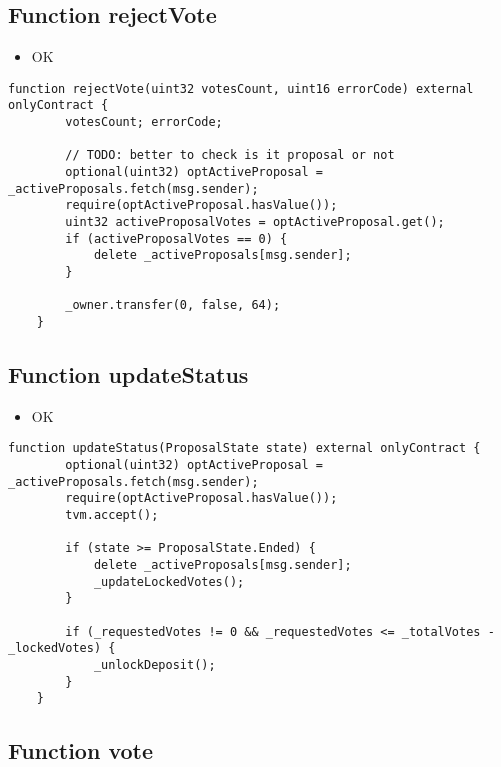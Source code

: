\subsection{Function rejectVote}

\begin{itemize}
\item OK
\end{itemize}

\begin{lstlisting}[firstnumber=87]
    function rejectVote(uint32 votesCount, uint16 errorCode) external onlyContract {
        votesCount; errorCode;

        // TODO: better to check is it proposal or not
        optional(uint32) optActiveProposal = _activeProposals.fetch(msg.sender);
        require(optActiveProposal.hasValue());
        uint32 activeProposalVotes = optActiveProposal.get();
        if (activeProposalVotes == 0) {
            delete _activeProposals[msg.sender];
        }

        _owner.transfer(0, false, 64);
    }
\end{lstlisting}

\subsection{Function updateStatus}

\begin{itemize}
\item OK
\end{itemize}

\begin{lstlisting}[firstnumber=127]
    function updateStatus(ProposalState state) external onlyContract {
        optional(uint32) optActiveProposal = _activeProposals.fetch(msg.sender);
        require(optActiveProposal.hasValue());
        tvm.accept();

        if (state >= ProposalState.Ended) {
            delete _activeProposals[msg.sender];
            _updateLockedVotes();
        }

        if (_requestedVotes != 0 && _requestedVotes <= _totalVotes - _lockedVotes) {
            _unlockDeposit();
        }
    }
\end{lstlisting}

\subsection{Function vote}

